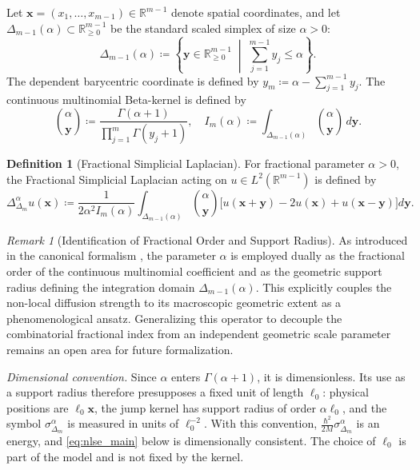 \documentclass[11pt,a4paper]{article}
\theoremstyle{plain}
\theoremstyle{definition}
\newtheorem{definition}[theorem]{Definition}
\theoremstyle{remark}
\newtheorem{remark}[theorem]{Remark}
\numberwithin{equation}{section}
\begin{document}
Let $\mathbf{x} = (x_1, \dots, x_{m-1}) \in \mathbb{R}^{m-1}$ denote spatial coordinates, and let $\Delta_{m-1}(\alpha) \subset \mathbb{R}_{\ge 0}^{m-1}$ be the standard scaled simplex of size $\alpha > 0$:
\begin{equation}
\Delta_{m-1}(\alpha) \coloneqq \left\{\mathbf{y} \in \mathbb{R}_{\ge 0}^{m-1} \;\middle|\; \sum_{j=1}^{m-1} y_j \le \alpha\right\}.
\end{equation}
The dependent barycentric coordinate is defined by $y_m \coloneqq \alpha - \sum_{j=1}^{m-1} y_j$. The continuous multinomial Beta-kernel is defined by
\begin{equation}
\binom{\alpha}{\mathbf{y}} \coloneqq \frac{\Gamma(\alpha+1)}{\prod_{j=1}^m \Gamma(y_j+1)}, \quad I_m(\alpha) \coloneqq \int_{\Delta_{m-1}(\alpha)} \binom{\alpha}{\mathbf{y}} \, d\mathbf{y}.
\end{equation}

\begin{definition}[Fractional Simplicial Laplacian]
For fractional parameter $\alpha > 0$, the Fractional Simplicial Laplacian acting on $u \in L^2(\mathbb{R}^{m-1})$ is defined by
\begin{equation}
\label{eq:simplicial_laplacian_def}
\Delta_{\Delta_m}^\alpha u(\mathbf{x}) \coloneqq \frac{1}{2\alpha^2 I_m(\alpha)}\int_{\Delta_{m-1}(\alpha)} \binom{\alpha}{\mathbf{y}} \Big[u(\mathbf{x}+\mathbf{y}) - 2u(\mathbf{x}) + u(\mathbf{x}-\mathbf{y})\Big] d\mathbf{y}.
\end{equation}
\end{definition}

\begin{remark}[Identification of Fractional Order and Support Radius]
As introduced in the canonical formalism \cite{silvafilho2026simplex}, the parameter $\alpha$ is employed dually as the fractional order of the continuous multinomial coefficient and as the geometric support radius defining the integration domain $\Delta_{m-1}(\alpha)$. This explicitly couples the non-local diffusion strength to its macroscopic geometric extent as a phenomenological ansatz. Generalizing this operator to decouple the combinatorial fractional index from an independent geometric scale parameter remains an open area for future formalization.

\emph{Dimensional convention.} Since $\alpha$ enters $\Gamma(\alpha+1)$, it is dimensionless. Its use as a support radius therefore presupposes a fixed unit of length $\ell_0$: physical positions are $\ell_0\mathbf{x}$, the jump kernel has support radius of order $\alpha\ell_0$, and the symbol $\sigma^\alpha_{\Delta_m}$ is measured in units of $\ell_0^{-2}$. With this convention, $\frac{\hbar^2}{2M}\sigma^\alpha_{\Delta_m}$ is an energy, and \eqref{eq:nlse_main} below is dimensionally consistent. The choice of $\ell_0$ is part of the model and is not fixed by the kernel.
\end{remark}
\end{document}

